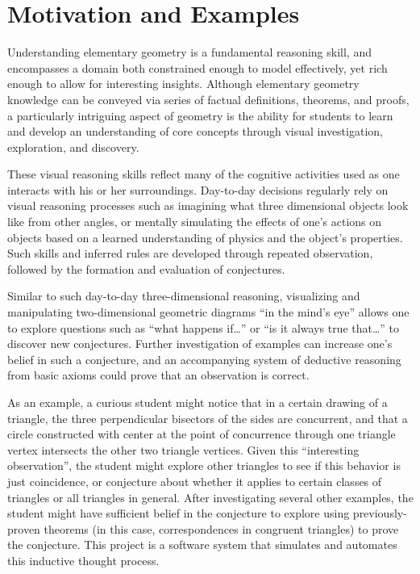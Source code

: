 \chapter{Motivation and Examples}
\label{chap:motivation}

Understanding elementary geometry is a fundamental reasoning skill,
and encompasses a domain both constrained enough to model effectively,
yet rich enough to allow for interesting insights.  Although
elementary geometry knowledge can be conveyed via series of factual
definitions, theorems, and proofs, a particularly intriguing aspect of
geometry is the ability for students to learn and develop an
understanding of core concepts through visual investigation,
exploration, and discovery.

These visual reasoning skills reflect many of the cognitive activities
used as one interacts with his or her surroundings.  Day-to-day
decisions regularly rely on visual reasoning processes such as
imagining what three dimensional objects look like from other angles,
or mentally simulating the effects of one's actions on objects based
on a learned understanding of physics and the object's properties.
Such skills and inferred rules are developed through repeated
observation, followed by the formation and evaluation of conjectures.

Similar to such day-to-day three-dimensional reasoning, visualizing
and manipulating two-dimensional geometric diagrams ``in the mind's
eye'' allows one to explore questions such as ``what happens
if\ldots'' or ``is it always true that\ldots'' to discover new
conjectures.  Further investigation of examples can increase one's
belief in such a conjecture, and an accompanying system of deductive
reasoning from basic axioms could prove that an observation is
correct.

As an example, a curious student might notice that in a certain
drawing of a triangle, the three perpendicular bisectors of the sides
are concurrent, and that a circle constructed with center at the point
of concurrence through one triangle vertex intersects the other two
triangle vertices.  Given this ``interesting observation'', the
student might explore other triangles to see if this behavior is just
coincidence, or conjecture about whether it applies to certain classes
of triangles or all triangles in general.  After investigating several
other examples, the student might have sufficient belief in the
conjecture to explore using previously-proven theorems (in this case,
correspondences in congruent triangles) to prove the conjecture.  This
project is a software system that simulates and automates this
inductive thought process.

